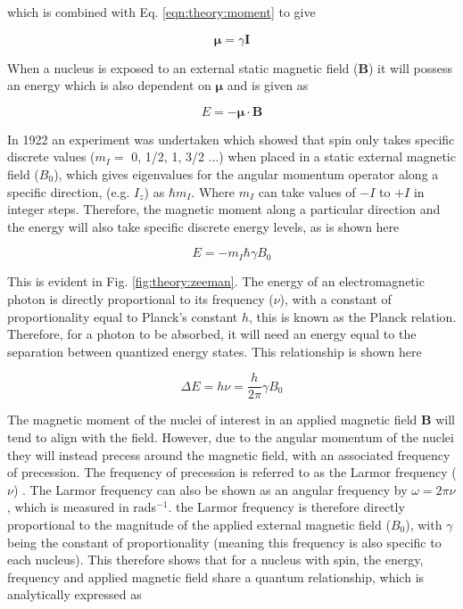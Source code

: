  \noindent which is combined with Eq. \ref{eqn:theory:moment} to give

\begin{equation}
    \boldsymbol{\mu} = \gamma \mathbf{I}
    \label{eqn:theory:moment_gyro}
\end{equation}

When a nucleus is exposed to an external static magnetic field ($\mathbf{B}$) it will possess an energy which is also dependent on $\boldsymbol\mu$ and is given as

\begin{equation}
    E = - \boldsymbol\mu \cdot \mathbf{B}
    \label{eqn:theory:Ebold}
\end{equation}

In 1922 an experiment was undertaken \cite{Gerlach1922DerMagnetfeld} which showed that spin only takes specific discrete values ($m_I =$ 0, 1/2, 1, 3/2 ...) when placed in a static external magnetic field ($B_0$), which gives eigenvalues for the angular momentum operator along a specific direction, (e.g. $I_z$) as $\hbar m_I$. Where $m_I$ can take values of $-I$ to $+I$ in integer steps. Therefore, the magnetic moment along a particular direction and the energy will also take specific discrete energy levels, as is shown here

\begin{equation}
    E = -m_I\hbar \gamma B_0
    \label{eqn:theory:ESpin}
\end{equation}

This is evident in Fig. \ref{fig:theory:zeeman}. The energy of an electromagnetic photon is directly proportional to its frequency ($\nu$), with a constant of proportionality equal to Planck's constant $h$, this is known as the Planck relation. Therefore, for a photon to be absorbed, it will need an energy equal to the separation between quantized energy states. This relationship is shown here

\begin{equation}
    \Delta E = h\nu = \frac{h}{2\pi}\gamma B_0
    \label{eqn:theory:ELamor}
\end{equation}  

The magnetic moment of the nuclei of interest in an applied magnetic field $\mathbf{B}$ will tend to align with the field. However, due to the angular momentum of the nuclei they will instead precess around the magnetic field, with an associated frequency of precession. The frequency of precession is referred to as the Larmor frequency ($\nu$) \cite{Larmor1897LXIII.Ions}. The Larmor frequency can also be shown as an angular frequency by $\omega=2\pi \nu$, which is measured in rads$^{-1}$. the Larmor frequency is therefore directly proportional to the magnitude of the applied external magnetic field ($B_0$), with $\gamma$ being the constant of proportionality (meaning this frequency is also specific to each nucleus). This therefore shows that for a nucleus with spin, the energy, frequency and applied magnetic field share a quantum relationship, which is analytically expressed as

